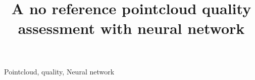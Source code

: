 \documentclass[lettersize,journal]{IEEEtran}
\begin{document}
\title{A no reference pointcloud quality assessment with neural network}

\author{}
\author{}



\maketitle

\begin{abstract}

\end{abstract}

\begin{IEEEkeywords}
Pointcloud, quality, Neural network
\end{IEEEkeywords}



\end{document}
